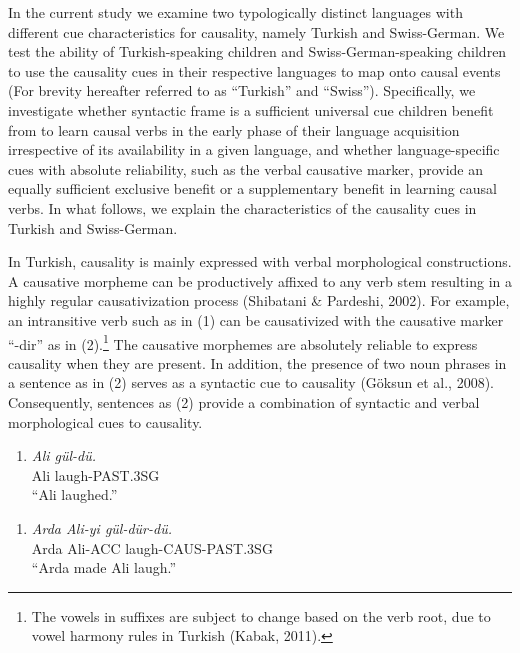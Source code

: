 \documentclass[man]{apa6}
\providecommand{\tightlist}{%
  \setlength{\itemsep}{0pt}\setlength{\parskip}{0pt}}
\let\rmarkdownfootnote\footnote%
\def\footnote{\protect\rmarkdownfootnote}
\begin{document}
In the current study we examine two typologically distinct languages
with different cue characteristics for causality, namely Turkish and
Swiss-German. We test the ability of Turkish-speaking children and Swiss-German-speaking children to use the causality cues in their
respective languages to map onto causal events (For brevity hereafter
referred to as \enquote{Turkish} and \enquote{Swiss}). Specifically,
we investigate whether syntactic frame is a sufficient universal cue
children benefit from to learn causal verbs in the early phase of their
language acquisition irrespective of its availability in a given language,
and whether language-specific cues with absolute reliability, such as the
verbal causative marker, provide an equally sufficient exclusive benefit
or a supplementary benefit in learning causal verbs. In what follows, we
explain the characteristics of the causality cues in Turkish and Swiss-German.

In Turkish, causality is mainly expressed with verbal morphological
constructions. A causative morpheme can be productively affixed to any
verb stem resulting in a highly regular causativization process
(Shibatani \& Pardeshi, 2002). For example, an intransitive verb such as
in (1) can be causativized with the causative marker \enquote{-dir} as
in (2).\footnote{The vowels in suffixes are subject to change based on
  the verb root, due to vowel harmony rules in Turkish (Kabak, 2011).}
The causative morphemes are absolutely reliable to express causality when they are present. In addition, the presence of two noun phrases in a sentence as in (2) serves as a syntactic cue to causality (Göksun et al., 2008). Consequently, sentences as (2) provide a combination of syntactic and
verbal morphological cues to causality.

\begin{enumerate}
\def\labelenumi{(\arabic{enumi})}
\tightlist
\item
  \emph{Ali gül-dü.}\\
  Ali laugh-PAST.3SG\\
  \enquote{Ali laughed.}
\end{enumerate}

\newpage

\begin{enumerate}
\def\labelenumi{(\arabic{enumi})}
\setcounter{enumi}{1}
\tightlist
\item
  \emph{Arda Ali-yi gül-dür-dü.}\\
  Arda Ali-ACC laugh-CAUS-PAST.3SG\\
  \enquote{Arda made Ali laugh.}
\end{enumerate}
\end{document}
